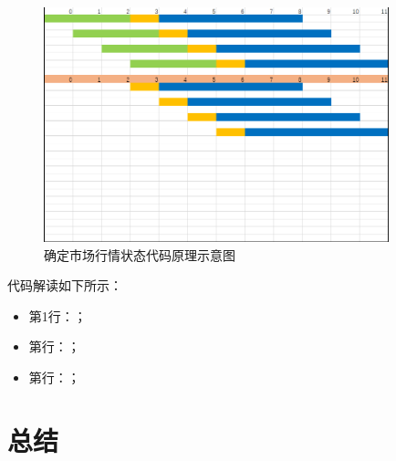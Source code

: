 \begin{figure}[H]
    \caption{确定市场行情状态代码原理示意图}
    \label{f000005}
    \centering
    \includegraphics[width=10cm]{images/f000005}
\end{figure}
代码解读如下所示：
\begin{itemize}
    \item 第1行：；
    \item 第行：；
    \item 第行：；
\end{itemize}

\section{总结}